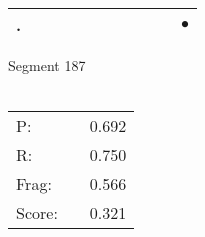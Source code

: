 \documentclass[landscape]{article}
\newcommand{\ssp}{\hspace{2pt}}
\newcommand{\mex}{\cellcolor{g}$\bullet$}
\begin{document}
\begin{tabular}{|l|p{10pt}|p{10pt}|p{10pt}|p{10pt}|p{10pt}|p{10pt}|p{10pt}|p{10pt}|p{10pt}|p{10pt}|}
\hline
\ssp \cellcolor{ref9}. \ssp&\hspace{2pt}&\hspace{2pt}&\hspace{2pt}&\hspace{2pt}&\hspace{2pt}&\hspace{2pt}&\hspace{2pt}&\hspace{2pt}&\hspace{2pt}&\hspace{2pt}\mex\\
\hline
\end{tabular}

\vspace{6pt}
\noindent Segment 187\\\\
\noindent\begin{tabular}{lm{12pt}r}
\hline
P:&&0.692\\
R:&&0.750\\
Frag:&&0.566\\
Score:&&0.321\\
\end{tabular}

\newpage
\end{document}
